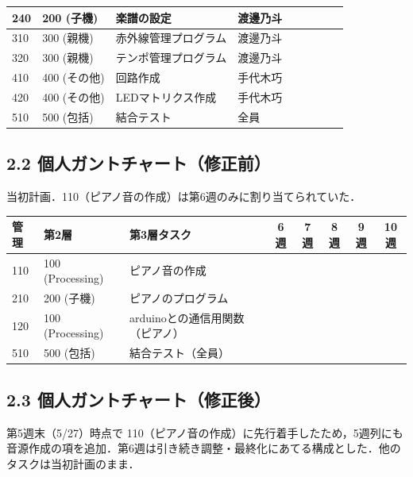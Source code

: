 \documentclass[a4paper,11pt]{ltjsarticle}
\providecommand{\％}{\%}
\begin{document}
\begin{longtable}{|p{0.9cm}|p{2.0cm}|p{4.4cm}|p{1.5cm}|c|c|c|c|c|}
\hline
240 & 200 (子機) & 楽譜の設定 & 渡邊乃斗 & \cellcolor{ganttCell} & & & & \\
\hline
310 & 300 (親機) & 赤外線管理プログラム & 渡邊乃斗 & & \cellcolor{ganttCell} & & & \\
\hline
320 & 300 (親機) & テンポ管理プログラム & 渡邊乃斗 & & & \cellcolor{ganttCell} & \cellcolor{ganttCell} & \\
\hline
410 & 400 (その他) & 回路作成 & 手代木巧 & \cellcolor{ganttCell} & & & & \\
\hline
420 & 400 (その他) & LEDマトリクス作成 & 手代木巧 & & \cellcolor{ganttCell} & \cellcolor{ganttCell} & \cellcolor{ganttCell} & \\
\hline
510 & 500 (包括) & 結合テスト & 全員 & & & & & \cellcolor{ganttCell} \\
\hline
\end{longtable}

\subsection*{2.2 個人ガントチャート（修正前）}

当初計画．110（ピアノ音の作成）は第6週のみに割り当てられていた．

\begin{longtable}{|p{0.9cm}|p{2.0cm}|p{6.6cm}|c|c|c|c|c|}
\hline
\rowcolor[gray]{0.9}
管理 & 第2層 & 第3層タスク & 6週 & 7週 & 8週 & 9週 & 10週 \\
\hline
110 & 100 (Processing) & ピアノ音の作成 & \cellcolor{ganttCell} & & & & \\
\hline
210 & 200 (子機) & ピアノのプログラム & & \cellcolor{ganttCell} & & & \\
\hline
120 & 100 (Processing) & arduinoとの通信用関数（ピアノ） & & & \cellcolor{ganttCell} & \cellcolor{ganttCell} & \\
\hline
510 & 500 (包括) & 結合テスト（全員） & & & & & \cellcolor{ganttCell} \\
\hline
\end{longtable}

\subsection*{2.3 個人ガントチャート（修正後）}

第5週末（5/27）時点で 110（ピアノ音の作成）に先行着手したため，5週列にも音源作成の項を追加．第6週は引き続き調整・最終化にあてる構成とした．他のタスクは当初計画のまま．
\end{document}
